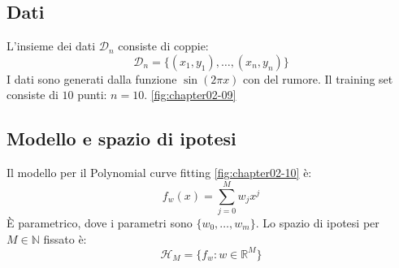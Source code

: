 	\subsection{Dati}
	L'insieme dei dati $\mathcal{D}_n$ consiste di coppie:
	$$\mathcal{D}_n = \{(x_1, y_1),\dots,(x_n,y_n)\}$$
	I dati sono generati dalla funzione $\sin(2\pi x)$ con del rumore.
	Il training set consiste di $10$ punti: $n = 10$. \ref{fig:chapter02-09}

	\subsection{Modello e spazio di ipotesi}
	Il modello per il Polynomial curve fitting \ref{fig:chapter02-10} \`e:
	$$f_w(x) = \sum\limits_{j = 0}^M w_jx^j$$
	\`E parametrico, dove i parametri sono $\{w_0,\dots, w_m\}$.
	Lo spazio di ipotesi per $M\in\mathbb{N}$ fissato \`e:
	$$\mathcal{H}_M = \{f_w:w\in\mathbb{R}^M\}$$


